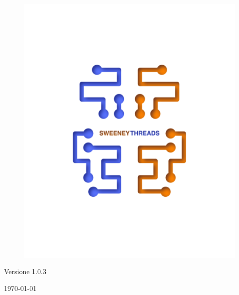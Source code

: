 \documentclass[a4paper]{report}
\begin{document}
\begin{titlepage}
		\begin{figure}[H]
			\centering
			\includegraphics[scale=0.8]{sweeney.png}
		\end{figure}
		\begin{center}
			Versione 1.0.3
		\end{center}
		{\large \today}\\[3cm] 
		\vfill  
	\end{titlepage}
	
	\tableofcontents
	
\end{document}
